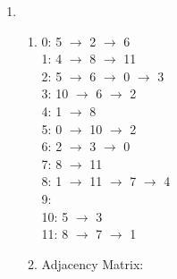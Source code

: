 \documentclass[11pt,fleqn]{article}
\begin{document}
\begin{enumerate}
	\item 	
		\begin{enumerate}
			\item 
0: 5 $\rightarrow$ 2 $\rightarrow$ 6 \\
1: 4 $\rightarrow$ 8 $\rightarrow$ 11 \\
2: 5 $\rightarrow$ 6 $\rightarrow$ 0 $\rightarrow$ 3 \\
3: 10 $\rightarrow$ 6 $\rightarrow$ 2 \\
4: 1 $\rightarrow$ 8 \\
5: 0 $\rightarrow$ 10 $\rightarrow$ 2 \\
6: 2 $\rightarrow$ 3 $\rightarrow$ 0 \\
7: 8 $\rightarrow$ 11 \\
8: 1 $\rightarrow$ 11 $\rightarrow$ 7 $\rightarrow$ 4 \\
9: \\
10: 5 $\rightarrow$ 3 \\
11: 8 $\rightarrow$ 7 $\rightarrow$ 1
			\item Adjacency Matrix:


\end{enumerate}
\end{enumerate}
\end{document}
